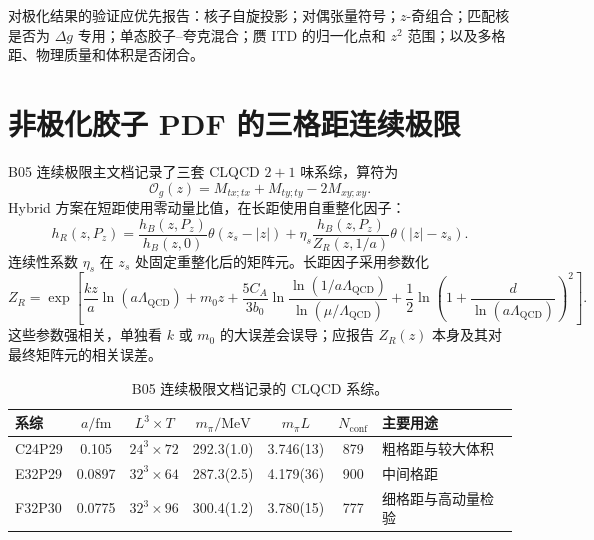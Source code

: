 对极化结果的验证应优先报告：核子自旋投影；对偶张量符号；\(z\)-奇组合；匹配核是否为 \(\Delta g\) 专用；单态胶子--夸克混合；赝 ITD 的归一化点和 \(z^2\) 范围；以及多格距、物理质量和体积是否闭合。

\section{非极化胶子 PDF 的三格距连续极限}

B05 连续极限主文档记录了三套 CLQCD \(2+1\) 味系综，算符为
\begin{equation}
  \mathcal O_g(z)=M_{tx;tx}+M_{ty;ty}-2M_{xy;xy}.
  \label{eq:b05-continuum-operator}
\end{equation}
Hybrid 方案在短距使用零动量比值，在长距使用自重整化因子：
\begin{equation}
  h_R(z,P_z)
  =\frac{h_B(z,P_z)}{h_B(z,0)}\theta(z_s-|z|)
   +\eta_s\frac{h_B(z,P_z)}{Z_R(z,1/a)}\theta(|z|-z_s).
  \label{eq:b05-hybrid}
\end{equation}
连续性系数 \(\eta_s\) 在 \(z_s\) 处固定重整化后的矩阵元。长距因子采用参数化
\begin{equation}
  Z_R=\exp\left[
    \frac{kz}{a}\ln(a\Lambda_{\mathrm{QCD}})+m_0z
    +\frac{5C_A}{3b_0}\ln\frac{\ln(1/a\Lambda_{\mathrm{QCD}})}
    {\ln(\mu/\Lambda_{\mathrm{QCD}})}
    +\frac12\ln\left(1+\frac{d}{\ln(a\Lambda_{\mathrm{QCD}})}\right)^2
  \right].
  \label{eq:b05-zr}
\end{equation}
这些参数强相关，单独看 \(k\) 或 \(m_0\) 的大误差会误导；应报告 \(Z_R(z)\) 本身及其对最终矩阵元的相关误差。

\begin{table}[H]
  \centering
  \caption{B05 连续极限文档记录的 CLQCD 系综。}
  \label{tab:b05-continuum-ensembles}
  \small
  \begin{tabularx}{\textwidth}{@{}lcccccX@{}}
    \toprule
    系综 & \(a/\mathrm{fm}\) & \(L^3\times T\) & \(m_\pi/\mathrm{MeV}\) & \(m_\pi L\) & \(N_{\mathrm{conf}}\) & 主要用途 \\
    \midrule
    C24P29 & 0.105 & \(24^3\times72\) & 292.3(1.0) & 3.746(13) & 879 & 粗格距与较大体积 \\
    E32P29 & 0.0897 & \(32^3\times64\) & 287.3(2.5) & 4.179(36) & 900 & 中间格距 \\
    F32P30 & 0.0775 & \(32^3\times96\) & 300.4(1.2) & 3.780(15) & 777 & 细格距与高动量检验 \\
    \bottomrule
  \end{tabularx}
\end{table}

